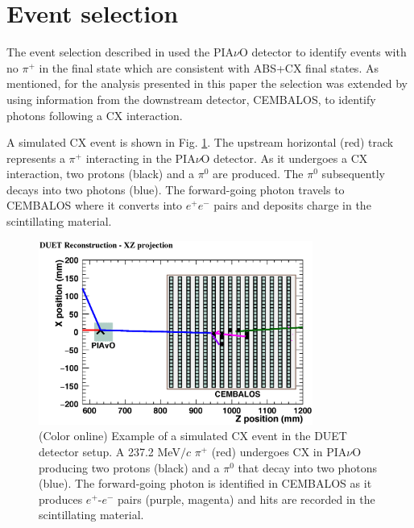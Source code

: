 \section{\label{sec:selection}Event selection}
The event selection described in \cite{duet} used the PIA$\nu$O detector to identify events with no $\pi^{+}$ in the final state which are consistent with ABS+CX final states. As mentioned, for the analysis presented in this paper the selection was extended by using information from the downstream detector, CEMBALOS, to identify photons following a CX interaction. 

A simulated CX event is shown in Fig. \ref{fig:event}. The upstream horizontal (red) track represents a $\pi^{+}$ interacting in the PIA$\nu$O detector. As it undergoes a CX interaction, two protons (black) and a $\pi^{0}$ are produced. The $\pi^{0}$ subsequently decays into two photons (blue). The forward-going photon travels to CEMBALOS where it converts into $e^{+}$$e^{-}$ pairs and deposits charge in the scintillating material.

\begin{figure}[ht]
\includegraphics[width=90mm]{figures/event_display_without_diagram.eps}
\caption{(Color online) Example of a simulated CX event in the DUET detector setup. A 237.2 MeV$/c$ $\pi^+$ (red) undergoes CX in PIA$\nu$O producing two protons (black) and a $\pi^0$ that decay into two photons (blue). The forward-going photon is identified in CEMBALOS as it produces $e^{+}$-$e^{-}$ pairs (purple, magenta) and hits are recorded in the scintillating material.}
\label{fig:event}
\end{figure}


